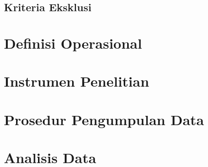\subsection{Kriteria Eksklusi}


\section{Definisi Operasional}

%

\section{Instrumen Penelitian}


\section{Prosedur Pengumpulan Data}


\section{Analisis Data}

